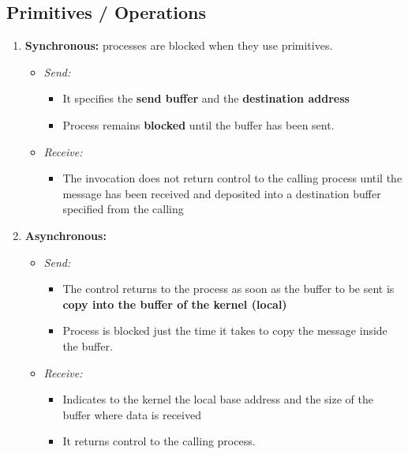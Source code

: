 \subsection{Primitives / Operations}
\begin{enumerate}
    \item \textbf{Synchronous:} processes are blocked when they use primitives.
        \begin{itemize}
            \item \textit{Send:}
                \begin{itemize}
                    \item It specifies the \textbf{send buffer} and the \textbf{destination address}
                    \item Process remains \textbf{blocked} until the buffer has been sent.
                \end{itemize}
            \item \textit{Receive:}
                \begin{itemize}
                    \item The invocation does not return control to the calling process until the message has been received and deposited into a destination buffer specified from the calling
                \end{itemize}
        \end{itemize}
    \item \textbf{Asynchronous:}
        \begin{itemize}
            \item \textit{Send:}
                \begin{itemize}
                    \item The control returns to the process as soon as the buffer to be sent is \textbf{copy into the buffer of the kernel (local)}
                    \item Process is blocked just the time it takes to copy the message inside the buffer.
                \end{itemize}
            \item \textit{Receive:}
                \begin{itemize}
                    \item Indicates to the kernel the local base address and the size of the buffer where data is received
                    \item It returns control to the calling process.
                \end{itemize}

\end{itemize}
\end{enumerate}
